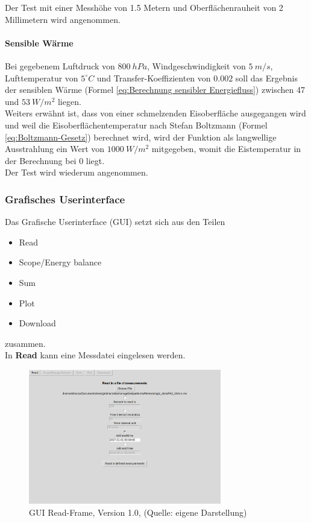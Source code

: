 \documentclass[11pt,a4paper]{article}
\newcommand{\guiplotsize}{0.75}
\newcommand{\guiversion}{1.0}
\begin{document}
Der Test mit einer Messhöhe von 1.5 Metern und Oberflächenrauheit von 2 Millimetern wird angenommen.

\paragraph{Sensible Wärme}
Bei gegebenem Luftdruck von $800~hPa$, Windgeschwindigkeit von $5~m/s$, Lufttemperatur von $5^\circ C$ und Transfer-Koeffizienten von $0.002$ soll das Ergebnis der sensiblen Wärme (Formel \ref{eq:Berechnung sensibler Energiefluss}) zwischen 47 und $53~W/m^2$ liegen. \\
Weiters erwähnt ist, dass von einer schmelzenden Eisoberfläche ausgegangen wird und weil die Eisoberflächentemperatur nach Stefan Boltzmann (Formel \ref{eq:Boltzmann-Gesetz}) berechnet wird, wird der Funktion als langwellige Ausstrahlung ein Wert von $1000~W/m^2$ mitgegeben, womit die Eistemperatur in der Berechnung bei 0 liegt.\\

Der Test wird wiederum angenommen.

\subsubsection{Grafisches Userinterface}
Das Grafische Userinterface (GUI) setzt sich aus den Teilen 
\begin{itemize}
\item Read
\item Scope/Energy balance
\item Sum
\item Plot
\item Download
\end{itemize}
zusammen.\\

In \textbf{Read} kann eine Messdatei eingelesen werden. 

\begin{figure}[H]
\centering
\includegraphics[width=\guiplotsize\textwidth]{pictures/GUI/Read_Frame.png}
\caption[GUI Read-Frame, Version \guiversion]{GUI Read-Frame, Version \guiversion, (Quelle: eigene Darstellung)}
\label{fig:GUI Read-Frame}
\end{figure}
\end{document}
